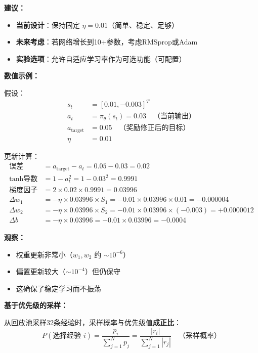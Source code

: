 \documentclass[11pt,a3paper]{ctexart}
\begin{document}
\textbf{建议：}
\begin{itemize}
    \item \textbf{当前设计}：保持固定 $\eta = 0.01$（简单、稳定、足够）
    \item \textbf{未来考虑}：若网络增长到10+参数，考虑RMSprop或Adam
    \item \textbf{实验选项}：允许自适应学习率作为可选功能（可配置）
\end{itemize}

\textbf{数值示例：}

假设：
\begin{align*}
s_t &= [0.01, -0.003]^T \\
a_t &= \pi_\theta(s_t) = 0.03 \quad \text{（当前输出）} \\
a_{\text{target}} &= 0.05 \quad \text{（奖励修正后的目标）} \\
\eta &= 0.01
\end{align*}

更新计算：
\begin{align*}
\text{误差} &= a_{\text{target}} - a_t = 0.05 - 0.03 = 0.02 \\
\text{tanh导数} &= 1 - a_t^2 = 1 - 0.03^2 = 0.9991 \\
\text{梯度因子} &= 2 \times 0.02 \times 0.9991 = 0.03996 \\
\Delta w_1 &= -\eta \times 0.03996 \times S_1 = -0.01 \times 0.03996 \times 0.01 = -0.000004 \\
\Delta w_2 &= -\eta \times 0.03996 \times S_2 = -0.01 \times 0.03996 \times (-0.003) = +0.0000012 \\
\Delta b &= -\eta \times 0.03996 = -0.01 \times 0.03996 = -0.0004
\end{align*}

\textbf{观察：}
\begin{itemize}
    \item 权重更新非常小（$w_1, w_2$ 约 $\sim 10^{-6}$）
    \item 偏置更新较大（$\sim 10^{-4}$）但仍保守
    \item 这确保了稳定学习而不振荡
\end{itemize}

\textbf{基于优先级的采样：}

从回放池采样32条经验时，采样概率与优先级值\textbf{成正比}：
\begin{equation}
P(\text{选择经验 } i) = \frac{p_i}{\sum_{j=1}^{N} p_j} = \frac{|r_i|}{\sum_{j=1}^{N} |r_j|} \quad \text{（采样概率）}
\end{equation}
\end{document}
